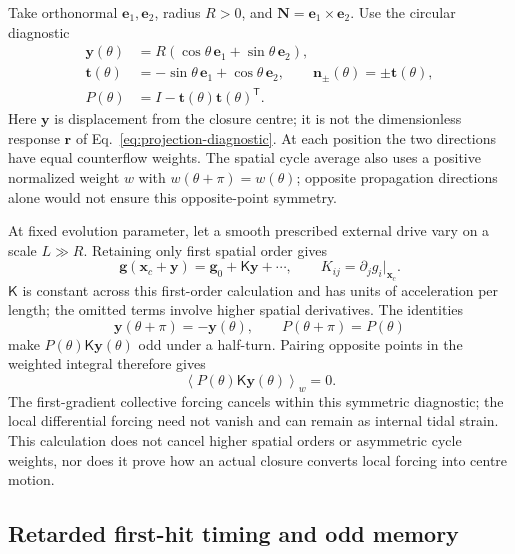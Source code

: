 \documentclass[11pt]{article}
\theoremstyle{plain}
\theoremstyle{remark}
\begin{document}
Take orthonormal $\mathbf e_1,\mathbf e_2$, radius $R>0$, and
$\mathbf N=\mathbf e_1\times\mathbf e_2$.  Use the circular diagnostic
\begin{align}
 \mathbf y(\theta)&=R(\cos\theta\,\mathbf e_1+\sin\theta\,\mathbf e_2),\\
 \mathbf t(\theta)&=-\sin\theta\,\mathbf e_1+\cos\theta\,\mathbf e_2,
 \qquad \mathbf n_\pm(\theta)=\pm\mathbf t(\theta),\\
 P(\theta)&=I-\mathbf t(\theta)\mathbf t(\theta)^{\mathsf T}.
 \label{eq:diag-ring}
\end{align}
Here $\mathbf y$ is displacement from the closure centre; it is not the
dimensionless response $\mathbf r$ of
Eq.~\eqref{eq:projection-diagnostic}.  At each position the two directions
have equal counterflow weights.  The spatial cycle average also uses a
positive normalized weight $w$ with
$w(\theta+\pi)=w(\theta)$; opposite propagation directions alone would
not ensure this opposite-point symmetry.

At fixed evolution parameter, let a smooth prescribed external drive
vary on a scale $L\gg R$.  Retaining only first spatial order gives
\begin{equation}
 \mathbf g(\mathbf x_c+\mathbf y)
 =\mathbf g_0+\mathsf K\mathbf y+\cdots,\qquad
 K_{ij}=\partial_jg_i\big|_{\mathbf x_c}.
 \label{eq:diag-gradient-expansion}
\end{equation}
$\mathsf K$ is constant across this first-order calculation and has
units of acceleration per length; the omitted terms involve higher
spatial derivatives.  The identities
\begin{equation}
 \mathbf y(\theta+\pi)=-\mathbf y(\theta),\qquad
 P(\theta+\pi)=P(\theta)
\end{equation}
make $P(\theta)\mathsf K\mathbf y(\theta)$ odd under a half-turn.
Pairing opposite points in the weighted integral therefore gives
\begin{equation}
 \boxed{\left\langle P(\theta)\mathsf K\mathbf y(\theta)
 \right\rangle_w=0.}
 \label{eq:diag-gradient-zero}
\end{equation}
The first-gradient collective forcing cancels within this symmetric
diagnostic; the local differential forcing need not vanish and can
remain as internal tidal strain.  This calculation does not cancel
higher spatial orders or asymmetric cycle weights, nor does it prove
how an actual closure converts local forcing into centre motion.



\subsection{Retarded first-hit timing and odd memory}
\label{app:projection-retarded}
\end{document}
